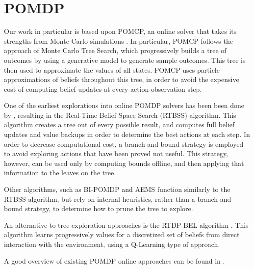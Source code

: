 \section{POMDP}

Our work in particular is based upon POMCP, an online solver that takes its strengths from
Monte-Carlo simulations \cite{cit:pomcp}. In particular, POMCP follows the approach of Monte Carlo
Tree Search, which progressively builds a tree of outcomes by using a generative model to generate
sample outcomes. This tree is then used to approximate the values of all states. POMCP uses particle
approximations of beliefs throughout this tree, in order to avoid the expensive cost of computing
belief updates at every action-observation step.

One of the earliest explorations into online POMDP solvers has been been done by
\cite{cit:relworkonline1}, resulting in the Real-Time Belief Space Search (RTBSS) algorithm. This
algorithm creates a tree out of every possible result, and computes full belief updates and value
backups in order to determine the best actions at each step. In order to decrease computational
cost, a branch and bound strategy is employed to avoid exploring actions that have been proved not
useful. This strategy, however, can be used only by computing bounds offline, and then applying that
information to the leaves on the tree.

Other algorithms, such as BI-POMDP \cite{cit:relworkonlinebi} and AEMS \cite{cit:relworkonlineaems}
function similarly to the RTBSS algorithm, but rely on internal heuristics, rather than a branch and
bound strategy, to determine how to prune the tree to explore.

An alternative to tree exploration approaches is the RTDP-BEL algorithm \cite{cit:relworkonlineq}.
This algorithm learns progressively values for a discretized set of beliefs from direct interaction
with the environment, using a Q-Learning type of approach.

A good overview of existing POMDP online approaches can be found in \cite{cit:relworkonlineall}.

